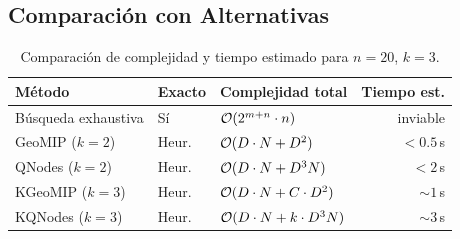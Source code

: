 \subsection{Comparación con Alternativas}

\begin{table}[H]
    \centering
    \caption{Comparación de complejidad y tiempo estimado para $n=20$, $k=3$.}
    \label{tab:comp_alternativas}
    \begin{tabular}{lllr}
        \toprule
        \textbf{Método} & \textbf{Exacto} & \textbf{Complejidad total} & \textbf{Tiempo est.} \\
        \midrule
        Búsqueda exhaustiva & Sí   & $\mathcal{O}(2^{m+n} \cdot n)$           & inviable \\
        GeoMIP ($k=2$)      & Heur.& $\mathcal{O}(D \cdot N + D^2)$           & $< 0.5\,$s \\
        QNodes ($k=2$)      & Heur.& $\mathcal{O}(D \cdot N + D^3 N)$         & $< 2\,$s \\
        KGeoMIP ($k=3$)     & Heur.& $\mathcal{O}(D \cdot N + C \cdot D^2)$   & $\sim 1\,$s \\
        KQNodes ($k=3$)     & Heur.& $\mathcal{O}(D \cdot N + k \cdot D^3 N)$ & $\sim 3\,$s \\
        \bottomrule
    \end{tabular}
\end{table}
